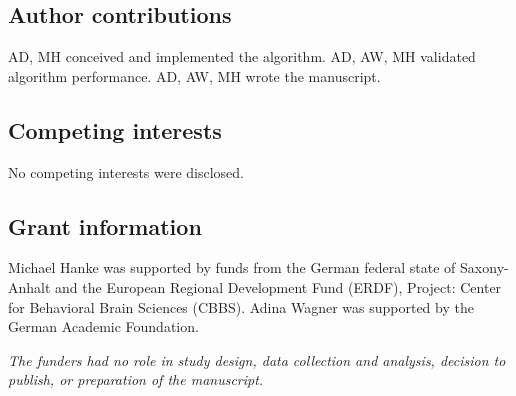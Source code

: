 \subsection*{Author contributions}


AD, MH conceived and implemented the algorithm.
AD, AW, MH validated algorithm performance.
AD, AW, MH wrote the manuscript.

\subsection*{Competing interests}


No competing interests were disclosed.

\subsection*{Grant information}


Michael Hanke was supported by funds from the German federal state of
Saxony-Anhalt and the European Regional Development Fund (ERDF),
Project: Center for Behavioral Brain Sciences (CBBS).
Adina Wagner was supported by the German Academic Foundation.

\textit{The funders had no role in study design, data collection and analysis,
decision to publish, or preparation of the manuscript.}


